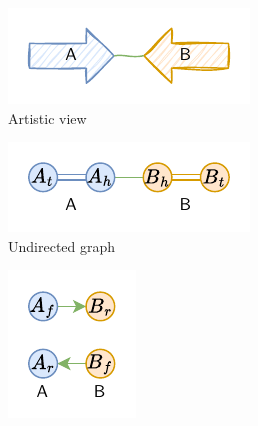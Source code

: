 \begin{figure}
  \centering
  \begin{subfigure}{0.35\linewidth}
    \centering
    \includegraphics[width=\linewidth]{introduction/img/sequence_graph-figure.pdf}
    \caption{Artistic view}\label{subfig:sequence_graph:artistic_view}
  \end{subfigure}
  \hfill
  \begin{subfigure}{0.35\linewidth}
    \centering
    \includegraphics[width=\linewidth]{introduction/img/sequence_graph-UG.pdf}
    \caption{Undirected graph}\label{subfig:sequence_graph:ug}
  \end{subfigure}
  \hfill
  \begin{subfigure}{0.185\linewidth}
    \centering
    \includegraphics[width=\linewidth]{introduction/img/sequence_graph-DG.pdf}

\end{subfigure}
\end{figure}
